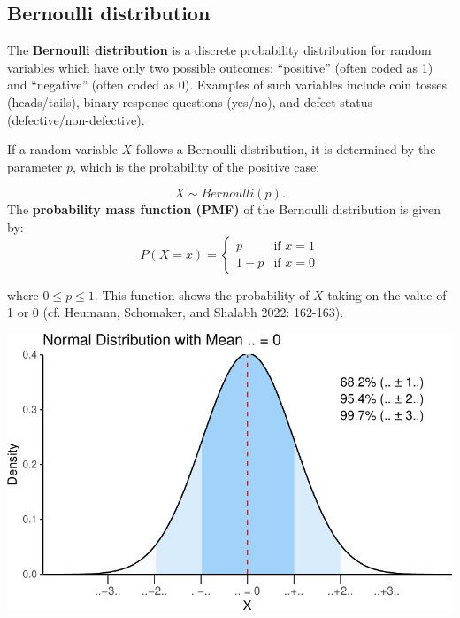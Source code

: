 \documentclass[
  11pt,
  letterpaper,
  DIV=11,
  numbers=noendperiod]{scrreprt}
\begin{document}
\subsection{Bernoulli distribution}\label{bernoulli-distribution}

The \textbf{Bernoulli distribution} is a discrete probability
distribution for random variables which have only two possible outcomes:
``positive'' (often coded as 1) and ``negative'' (often coded as 0).
Examples of such variables include coin tosses (heads/tails), binary
response questions (yes/no), and defect status
(defective/non-defective).

If a random variable \(X\) follows a Bernoulli distribution, it is
determined by the parameter \(p\), which is the probability of the
positive case:

\[ X \sim Bernoulli(p).\] The \textbf{probability mass function (PMF)}
of the Bernoulli distribution is given by: \[
P(X = x) = 
\begin{cases} 
p & \text{if } x = 1 \\
1 - p & \text{if } x = 0 
\end{cases}
\]

where \(0 \leq p \leq 1\). This function shows the probability of \(X\)
taking on the value of 1 or 0 (cf. Heumann, Schomaker, and Shalabh 2022:
162-163).

\includegraphics{Distributions_files/figure-pdf/unnamed-chunk-3-1.pdf}
\end{document}
